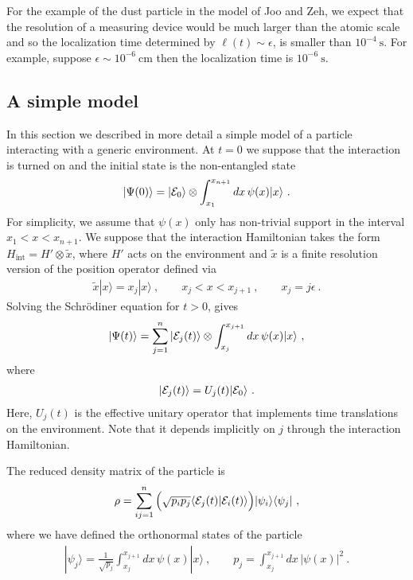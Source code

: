 \documentclass[12pt]{article}
\def\bra#1{\langle #1|}
\def\ket#1{| #1\rangle}
\def\braket#1#2{\VEV{#1 | #2}}
\def\VEV#1{\langle #1\rangle}
\newcommand{\EQ}[1]{\begin{equation}\begin{split} #1
\end{split}\end{equation}}
\begin{document}
For the example of the dust particle in the model of Joo and Zeh, we expect that the resolution of a measuring device would be much larger than the atomic scale and so the localization time determined by $\ell(t)\sim\epsilon$, is smaller than $10^{-4}\ \text{s}$. For example, suppose $\epsilon\sim10^{-6}\ \text{cm}$ then the localization time is $10^{-6}\ \text{s}$.

\subsection{A simple model}

In this section we described in more detail a simple model of a particle interacting with a generic environment. At $t=0$ we suppose that the interaction is turned on and the initial state is the non-entangled state
\EQ{
\ket{\Psi(0)}=\ket{{\cal E}_0}\otimes\int_{x_1}^{x_{n+1}}dx\,\psi(x)\ket{x}\ .
}
For simplicity, we assume that $\psi(x)$ only has non-trivial support in the interval $x_1<x<x_{n+1}$. We suppose that the interaction Hamiltonian takes the form $H_\text{int}=H'\otimes\tilde x$, where $H'$ acts on the environment and $\tilde x$ is a finite resolution version of the position operator defined via
\EQ{
\tilde x\ket{x}=x_j\ket{x}\ ,\qquad x_j<x<x_{j+1}\ ,\qquad x_j=j\epsilon\ .
}
Solving the Schr\"odiner equation for $t>0$, gives
\EQ{
\ket{\Psi(t)}=\sum_{j=1}^n\ket{{\cal E}_j(t)}\otimes\int_{x_j}^{x_{j+1}} dx\,\psi(x)\ket{x}\ ,
\label{ww1}
}
where
\EQ{
\ket{{\cal E}_j(t)}=U_j(t)\ket{{\cal E}_0}\ .
}
Here, $U_j(t)$ is the effective unitary operator that implements time translations on the environment. Note that it depends implicitly on $j$ through the interaction Hamiltonian.

The reduced density matrix of the particle is
\EQ{
\rho=\sum_{ij=1}^n\Big(\sqrt{p_ip_j}\braket{{\cal E}_j(t)}{{\cal E}_i(t)}\Big)\ket{\psi_i}\bra{\psi_j}\ ,
\label{uu1}
}
where we have defined the orthonormal states of the particle
\EQ{
\ket{\psi_j}=\frac1{\sqrt{p_j}}\int_{x_j}^{x_{j+1}}dx\,\psi(x)\ket{x}\ , \qquad p_j=\int_{x_j}^{x_{j+1}}dx\,|\psi(x)|^2\ .
\label{bb1}
}
\end{document}
